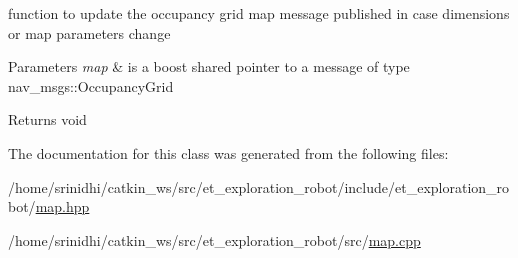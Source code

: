 function to update the occupancy grid map message published in case dimensions or map parameters change 


\begin{DoxyParams}{Parameters}
{\em map} & is a boost shared pointer to a message of type nav\+\_\+msgs\+::\+Occupancy\+Grid\\
\hline
\end{DoxyParams}
\begin{DoxyReturn}{Returns}
void 
\end{DoxyReturn}


The documentation for this class was generated from the following files\+:\begin{DoxyCompactItemize}
\item 
/home/srinidhi/catkin\+\_\+ws/src/et\+\_\+exploration\+\_\+robot/include/et\+\_\+exploration\+\_\+robot/\hyperlink{map_8hpp}{map.\+hpp}\item 
/home/srinidhi/catkin\+\_\+ws/src/et\+\_\+exploration\+\_\+robot/src/\hyperlink{map_8cpp}{map.\+cpp}\end{DoxyCompactItemize}
